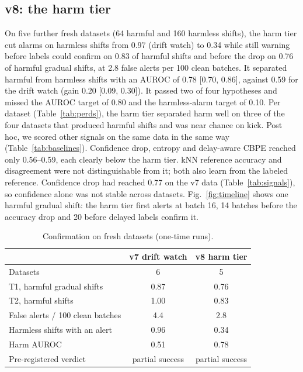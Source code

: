 \documentclass[conference]{IEEEtran}
\begin{document}
\subsection{v8: the harm tier}
On five further fresh datasets (64 harmful and 160 harmless shifts), the harm tier cut alarms on harmless shifts from 0.97 (drift watch) to 0.34 while still warning before labels could confirm on 0.83 of harmful shifts and before the drop on 0.76 of harmful gradual shifts, at 2.8 false alerts per 100 clean batches. It separated harmful from harmless shifts with an AUROC of 0.78 [0.70, 0.86], against 0.59 for the drift watch (gain 0.20 [0.09, 0.30]). It passed two of four hypotheses and missed the AUROC target of 0.80 and the harmless-alarm target of 0.10. Per dataset (Table~\ref{tab:perds}), the harm tier separated harm well on three of the four datasets that produced harmful shifts and was near chance on kick. Post hoc, we scored other signals on the same data in the same way (Table~\ref{tab:baselines}). Confidence drop, entropy and delay-aware CBPE reached only 0.56--0.59, each clearly below the harm tier. kNN reference accuracy and disagreement were not distinguishable from it; both also learn from the labeled reference. Confidence drop had reached 0.77 on the v7 data (Table~\ref{tab:signals}), so confidence alone was not stable across datasets. Fig.~\ref{fig:timeline} shows one harmful gradual shift: the harm tier first alerts at batch 16, 14 batches before the accuracy drop and 20 before delayed labels confirm it.

\begin{table}[t]
\caption{Confirmation on fresh datasets (one-time runs).}
\label{tab:confirm}
\centering
\footnotesize
\begin{tabular}{@{}lcc@{}}
\toprule
& v7 drift watch & v8 harm tier \\
\midrule
Datasets & 6 & 5 \\
T1, harmful gradual shifts & 0.87 & 0.76 \\
T2, harmful shifts & 1.00 & 0.83 \\
False alerts / 100 clean batches & 4.4 & 2.8 \\
Harmless shifts with an alert & 0.96 & 0.34 \\
Harm AUROC & 0.51 & 0.78 \\
Pre-registered verdict & partial success & partial success \\
\bottomrule
\end{tabular}
\end{table}
\end{document}
